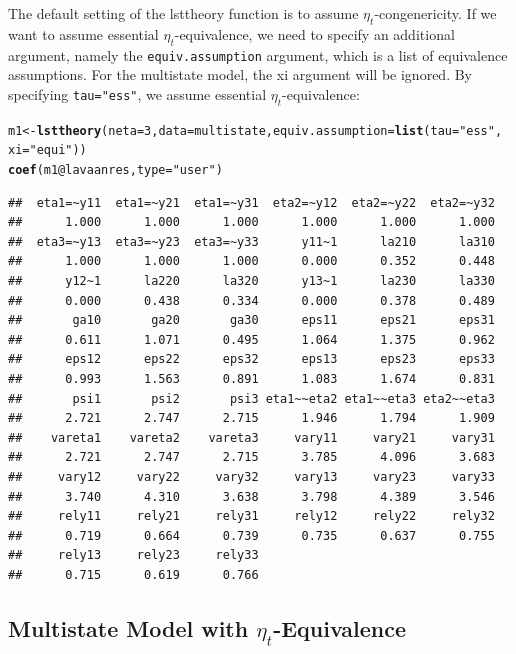 \documentclass[10pt]{article}\usepackage{graphicx, color}
\makeatletter
\newcommand{\hlfunctioncall}[1]{\textcolor[rgb]{0.501960784313725,0,0.329411764705882}{\textbf{#1}}}%
\newcommand{\hlstring}[1]{\textcolor[rgb]{0.6,0.6,1}{#1}}%
\newenvironment{kframe}{%
 \def\at@end@of@kframe{}%
 \ifinner\ifhmode%
  \def\at@end@of@kframe{\end{minipage}}%
  \begin{minipage}{\columnwidth}%
 \fi\fi%
 \def\FrameCommand##1{\hskip\@totalleftmargin \hskip-\fboxsep
 \colorbox{shadecolor}{##1}\hskip-\fboxsep
     \hskip-\linewidth \hskip-\@totalleftmargin \hskip\columnwidth}%
 \MakeFramed {\advance\hsize-\width
   \@totalleftmargin\z@ \linewidth\hsize
   \@setminipage}}%
 {\par\unskip\endMakeFramed%
 \at@end@of@kframe}
\newenvironment{knitrout}{}{} %
\makeatother
\begin{document}
The default setting of the lsttheory function is to assume $\eta_t$-congenericity. If we want to assume essential $\eta_t$-equivalence, we need to specify an additional argument, namely the \texttt{equiv.assumption} argument, which is a list of equivalence assumptions. For the multistate model, the xi argument will be ignored. By specifying \texttt{tau="ess"}, we assume essential $\eta_t$-equivalence:
%
\begin{knitrout}
\color{fgcolor}\begin{kframe}
\begin{alltt}
m1 <- \hlfunctioncall{lsttheory}(neta = 3, data = multistate, equiv.assumption = \hlfunctioncall{list}(tau = \hlstring{"ess"}, 
    xi = \hlstring{"equi"}))
\hlfunctioncall{coef}(m1@lavaanres, type = \hlstring{"user"})
\end{alltt}
\begin{verbatim}
##  eta1=~y11  eta1=~y21  eta1=~y31  eta2=~y12  eta2=~y22  eta2=~y32 
##      1.000      1.000      1.000      1.000      1.000      1.000 
##  eta3=~y13  eta3=~y23  eta3=~y33      y11~1      la210      la310 
##      1.000      1.000      1.000      0.000      0.352      0.448 
##      y12~1      la220      la320      y13~1      la230      la330 
##      0.000      0.438      0.334      0.000      0.378      0.489 
##       ga10       ga20       ga30      eps11      eps21      eps31 
##      0.611      1.071      0.495      1.064      1.375      0.962 
##      eps12      eps22      eps32      eps13      eps23      eps33 
##      0.993      1.563      0.891      1.083      1.674      0.831 
##       psi1       psi2       psi3 eta1~~eta2 eta1~~eta3 eta2~~eta3 
##      2.721      2.747      2.715      1.946      1.794      1.909 
##    vareta1    vareta2    vareta3     vary11     vary21     vary31 
##      2.721      2.747      2.715      3.785      4.096      3.683 
##     vary12     vary22     vary32     vary13     vary23     vary33 
##      3.740      4.310      3.638      3.798      4.389      3.546 
##     rely11     rely21     rely31     rely12     rely22     rely32 
##      0.719      0.664      0.739      0.735      0.637      0.755 
##     rely13     rely23     rely33 
##      0.715      0.619      0.766
\end{verbatim}
\end{kframe}
\end{knitrout}

%



\subsection{Multistate Model with $\eta_t$-Equivalence}
\end{document}
